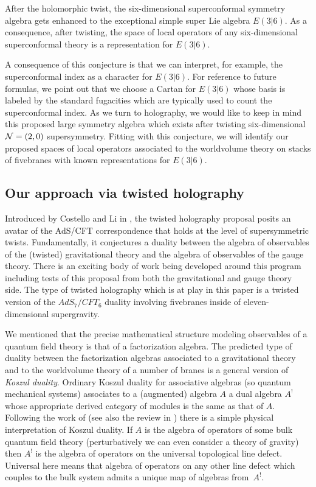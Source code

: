 \documentclass[11pt]{amsart}
\begin{document}
\begin{conj}
After the holomorphic twist, the six-dimensional superconformal symmetry algebra gets enhanced to the exceptional simple super Lie algebra $E(3|6)$.
As a consequence, after twisting, the space of local operators of any six-dimensional superconformal theory is a representation for $E(3|6)$.
\end{conj}

A consequence of this conjecture is that we can interpret, for example, the superconformal index as a character for $E(3|6)$. 
For reference to future formulas, we point out that we choose a Cartan for $E(3|6)$ whose basis is labeled by the standard fugacities which are typically used to count the superconformal index.
As we turn to holography, we would like to keep in mind this proposed large symmetry algebra which exists after twisting six-dimensional $\mathcal N=(2,0)$ supersymmetry. 
Fitting with this conjecture, we will identify our proposed spaces of local operators associated to the worldvolume theory on stacks of fivebranes with known representations for $E(3|6)$. 

\subsection{Our approach via twisted holography}
Introduced by Costello and Li in \cite{CLsugra}, the twisted holography proposal posits an avatar of the AdS/CFT correspondence that holds at the level of supersymmetric twists. 
Fundamentally, it conjectures a duality between the algebra of observables of the (twisted) gravitational theory and the algebra of observables of the gauge theory.
There is an exciting body of work being developed around this program including tests of this proposal from both the gravitational and gauge theory side.
The type of twisted holography which is at play in this paper is a twisted version of the $AdS_7/CFT_6$ duality involving fivebranes inside of eleven-dimensional supergravity.  

We mentioned that the precise mathematical structure modeling observables of a quantum field theory is that of a factorization algebra.
The predicted type of duality between the factorization algebras associated to a gravitational theory and to the worldvolume theory of a number of branes is a general version of \textit{Koszul duality}.
Ordinary Koszul duality for associative algebras (so quantum mechanical systems) associates to a (augmented) algebra $A$ a dual algebra $A^!$ whose appropriate derived category of modules is the same as that of $A$. 
Following the work of \cite{CLsugra,CP1} (see also the review in \cite{PWkoszul}) there is a simple physical interpretation of Koszul duality.
If $A$ is the algebra of operators of some bulk quantum field theory (perturbatively we can even consider a theory of gravity) then $A^!$ is the algebra of operators on the universal topological line defect.
Universal here means that algebra of operators on any other line defect which couples to the bulk system admits a unique map of algebras from~$A^!$. 
\end{document}
